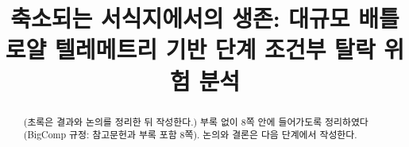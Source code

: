 \documentclass[conference]{IEEEtran}
\newcommand{\rev}[1]{{\color{revblue}#1}}
\begin{document}
\title{축소되는 서식지에서의 생존: 대규모 배틀로얄 텔레메트리 기반 단계 조건부 탈락 위험 분석}
\author{}
\maketitle

\begin{abstract}
(초록은 결과와 논의를 정리한 뒤 작성한다.) \rev{부록 없이 8쪽 안에 들어가도록 정리하였다(BigComp 규정: 참고문헌과 부록 포함 8쪽). 논의와 결론은 다음 단계에서 작성한다.}
\end{abstract}








\end{document}
